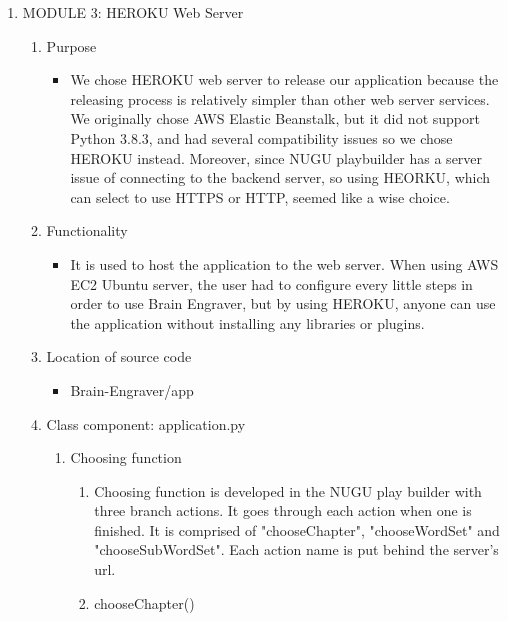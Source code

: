 \documentclass[conference]{IEEEtran}
\begin{document}
\begin{enumerate}
        \item MODULE 3: HEROKU Web Server
            \begin{enumerate}
                \item Purpose
                    \begin{itemize}
                        \item We chose HEROKU web server to release our application because the releasing process is relatively simpler than other web server services. We originally chose AWS Elastic Beanstalk, but it did not support Python 3.8.3, and had several compatibility issues so we chose HEROKU instead. Moreover, since NUGU playbuilder has a server issue of connecting to the backend server, so using HEORKU, which can select to use HTTPS or HTTP, seemed like a wise choice.
                    \end{itemize}
                \item Functionality
                    \begin{itemize}
                        \item It is used to host the application to the web server. When using AWS EC2 Ubuntu server, the user had to configure every little steps in order to use Brain Engraver, but by using HEROKU, anyone can use the application without installing any libraries or plugins.
                    \end{itemize}
                \item Location of source code
                    \begin{itemize}
                        \item Brain-Engraver/app
                    \end{itemize}
                \item Class component: application.py
                    \begin{enumerate}
                        \item Choosing function
                            \begin{enumerate}
                                \item Choosing function is developed in the NUGU play builder with three branch actions. It goes through each action when one is finished. It is comprised of "chooseChapter", "chooseWordSet" and "chooseSubWordSet". Each action name is put behind the server's url.
                                \item chooseChapter()
                                    \begin{itemize}

\end{itemize}
\end{enumerate}
\end{enumerate}
\end{enumerate}
\end{enumerate}
\end{document}
